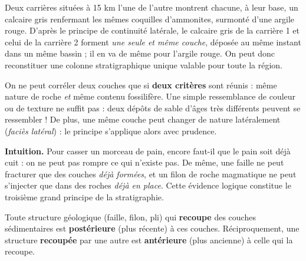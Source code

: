 \documentclass[11pt]{article}
\newcommand{\cle}[1]{{\popxbold\color{popdark}#1}}
\newcounter{popsec}
\newcounter{popsub}
\newcommand{\courssub}[1]{%
  \stepcounter{popsub}%
  \par\vspace{9pt}\noindent{\popxbold\fontsize{11.5}{13}\selectfont\color{popink}{\color{poporange}\thepopsec.\thepopsub}\hspace{6pt}#1}\par\nopagebreak\vspace{4pt}
}
\begin{document}
\begin{exemplebox}
Deux carrières situées à 15 km l'une de l'autre montrent chacune, à leur base, un calcaire gris renfermant les mêmes coquilles d'ammonites, surmonté d'une argile rouge. D'après le principe de continuité latérale, le calcaire gris de la carrière 1 et celui de la carrière 2 forment \emph{une seule et même couche}, déposée au même instant dans un même bassin ; il en va de même pour l'argile rouge. On peut donc reconstituer une colonne stratigraphique unique valable pour toute la région.
\end{exemplebox}

\begin{attention}
On ne peut corréler deux couches que si \textbf{deux critères} sont réunis : même nature de roche \emph{et} même contenu fossilifère. Une simple ressemblance de couleur ou de texture ne suffit pas : deux dépôts de sable d'âges très différents peuvent se ressembler ! De plus, une même couche peut changer de nature latéralement (\emph{faciès latéral}) : le principe s'applique alors avec prudence.
\end{attention}

\courssub{Le principe de recoupement}

\textbf{Intuition.} Pour casser un morceau de pain, encore faut-il que le pain soit déjà cuit : on ne peut pas rompre ce qui n'existe pas. De même, une faille ne peut fracturer que des couches \emph{déjà formées}, et un filon de roche magmatique ne peut s'injecter que dans des roches \emph{déjà en place}. Cette évidence logique constitue le troisième grand principe de la stratigraphie.

\begin{propriete}
Toute structure géologique (\cle{faille}, \cle{filon}, \cle{pli}) qui \textbf{recoupe} des couches sédimentaires est \textbf{postérieure} (plus récente) à ces couches. Réciproquement, une structure \textbf{recoupée} par une autre est \textbf{antérieure} (plus ancienne) à celle qui la recoupe.
\end{propriete}
\end{document}
